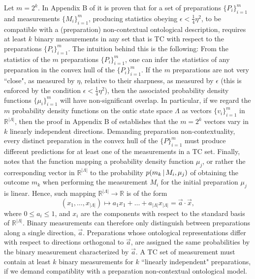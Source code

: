 Let $m=2^k$. In Appendix B of \cite{Pusey2019a} it is proven that for a set of preparations $\{P_i\}_{i=1}^m$ and measurements $\{M_i\}_{i=1}^m$, producing statistics obeying $\epsilon<\frac{1}{4}\eta^2$, to be compatible with a (preparation) non-contextual ontological description, requires at least $k$ binary measurements in any set that is TC with respect to the preparations $\{P_i\}_{i=1}^m$. The intuition behind this is the following: From the statistics of the $m$ preparations $\{P_i\}_{i=1}^m$, one can infer the statistics of any preparation in the convex hull of the $\{P_i\}_{i=1}^m$. If the $m$ preparations are not very ``close", as measured by $\eta$, relative to their sharpness, as measured by $\epsilon$ (this is enforced by the condition $\epsilon<\frac{1}{4}\eta^2$), then the associated probability density functions $\{\mu_i\}_{i=1}^m$ will have non-significant overlap. In particular, if we regard the $m$ probability density functions on the ontic state space $\Lambda$ as vectors $\{v_i\}_{i=1}^m$ in $\mathbb{R}^{\vert \Lambda \vert}$, then the proof in Appendix B of \cite{Pusey2019a} establishes that the $m=2^k$ vectors vary in $k$ linearly independent directions. Demanding preparation non-contextuality, every distinct preparation in the convex hull of the $\{P\}_{i=1}^m$ must produce different predictions for at least one of the measurements in a TC set. Finally, \cite{Pusey2019a} notes that the function mapping a probability density function $\mu_j$, or rather the corresponding vector in $\mathbb{R}^{\vert \Lambda \vert}$ to the probability $p(m_k\thinspace\vert\thinspace M_i,\mu_j)$ of obtaining the outcome $m_k$ when performing the measurement $M_i$ for the initial preparation $\mu_j$ is linear. Hence, such mapping $\mathbb{R}^{\vert \Lambda \vert}\rightarrow\mathbb{R}$ is of the form \[(x_1,\dots,x_{\vert \Lambda \vert})\mapsto a_1 x_1+\dots + a_{\vert \Lambda \vert} x_{\vert \Lambda \vert} = \vec{a}\cdot \vec{x},\] where $0 \leq a_i \leq 1$, and $x_i$ are the components with respect to the standard basis of $\mathbb{R}^{\vert \Lambda \vert}$. Binary measurements can therefore only distinguish between preparations along a single direction, $\vec{a}$. Preparations whose ontological representations differ with respect to directions orthogonal to $\vec{a}$, are assigned the same probabilities by the binary measurement characterized by $\vec{a}$. A TC set of measurement must contain at least $k$ binary measurements for $k$ ``linearly independent" preparations, if we demand compatiblity with a preparation non-contextual ontological model.

